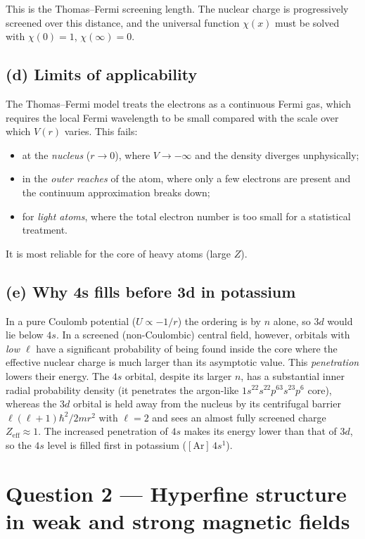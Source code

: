 \documentclass[11pt]{article}
\begin{document}
This is the Thomas--Fermi screening length. The nuclear charge is progressively screened over this distance, and the universal function $\chi(x)$ must be solved with $\chi(0)=1$, $\chi(\infty)=0$.

\subsection*{(d) Limits of applicability}

The Thomas--Fermi model treats the electrons as a continuous Fermi gas, which requires the local Fermi wavelength to be small compared with the scale over which $V(r)$ varies. This fails:
\begin{itemize}
    \item at the \emph{nucleus} ($r\to0$), where $V\to-\infty$ and the density diverges unphysically;
    \item in the \emph{outer reaches} of the atom, where only a few electrons are present and the continuum approximation breaks down;
    \item for \emph{light atoms}, where the total electron number is too small for a statistical treatment.
\end{itemize}
It is most reliable for the core of heavy atoms (large $Z$).

\subsection*{(e) Why 4s fills before 3d in potassium}

In a pure Coulomb potential ($U\propto-1/r$) the ordering is by $n$ alone, so $3d$ would lie below $4s$. In a screened (non-Coulombic) central field, however, orbitals with \emph{low $\ell$} have a significant probability of being found inside the core where the effective nuclear charge is much larger than its asymptotic value. This \emph{penetration} lowers their energy. The $4s$ orbital, despite its larger $n$, has a substantial inner radial probability density (it penetrates the argon-like $1s^22s^22p^63s^23p^6$ core), whereas the $3d$ orbital is held away from the nucleus by its centrifugal barrier $\ell(\ell+1)\hbar^2/2mr^2$ with $\ell=2$ and sees an almost fully screened charge $Z_\text{eff}\approx 1$. The increased penetration of $4s$ makes its energy lower than that of $3d$, so the $4s$ level is filled first in potassium ($[\text{Ar}]\,4s^1$).

\section*{Question 2 --- Hyperfine structure in weak and strong magnetic fields}
\end{document}
